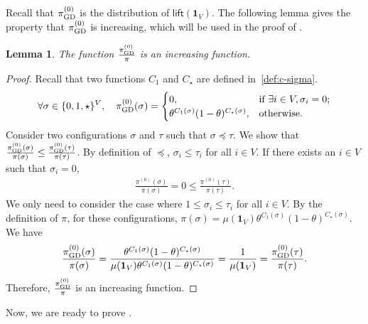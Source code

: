 \documentclass[11pt,a4paper]{article}
\newtheorem{lemma}[theorem]{Lemma}
\theoremstyle{definition}
\def\*#1{\mathbf{#1}} %
\begin{document}
Recall that $\pi^{(0)}_{\textnormal{GD}}$ is the distribution of $\textsf{lift}(\*1_V)$. The following lemma gives the property that $\pi^{(0)}_{\textnormal{GD}}$ is increasing, which will be used in the proof of .

\begin{lemma}\label{lem:pi-0-gd}
The function $\frac{\pi^{(0)}_{\textnormal{GD}}}{\pi}$ is an increasing function.
\end{lemma}
\begin{proof}
    Recall that two functions $C_1$ and $C_\star$ are defined in~\eqref{def:c-sigma}. 
    \begin{align*}
     \forall \sigma\in \{0,1,\star\}^V,\quad   \pi^{(0)}_{\textnormal{GD}}(\sigma) = \begin{cases}
            0, & \text{if } \exists i\in V, \sigma_i=0;\\
            \theta^{C_1(\sigma)}(1-\theta)^{C_\star(\sigma)}, & \text{otherwise}.
        \end{cases}  
    \end{align*}
    Consider two configurations $\sigma$ and $\tau$ such that $\sigma\preceq \tau$. We show that $\frac{\pi^{(0)}_{\textnormal{GD}}(\sigma)}{\pi(\sigma)}\leq \frac{\pi^{(0)}_{\textnormal{GD}}(\tau)}{\pi(\tau)}$. By definition of $\preceq$, $\sigma_i\leq\tau_i$ for all $i\in V$. If there exists an $i\in V$ such that $\sigma_i=0$,
    \begin{align*}
    \frac{\pi^{(0)}(\sigma)}{\pi(\sigma)}=0\leq \frac{\pi^{(0)}(\tau)}{\pi(\tau)}.
    \end{align*}
    We only need to consider the case where $1\leq \sigma_i\leq \tau_i$ for all $i\in V$.
    By the definition of $\pi$, for these configurations, $\pi(\sigma)=\mu(\*1_V)\theta^{C_1(\sigma)}(1-\theta)^{C_\star(\sigma)}$. We have
    \begin{align*}
    \frac{\pi^{(0)}_{\textnormal{GD}}(\sigma)}{\pi(\sigma)}=\frac{\theta^{C_1(\sigma)}(1-\theta)^{C_\star(\sigma)}}{\mu(\*1_V)\theta^{C_1(\sigma)}(1-\theta)^{C_\star(\sigma)}}=\frac{1}{\mu(\*1_V)}=\frac{\pi^{(0)}_{\textnormal{GD}}(\tau)}{\pi(\tau)}.
    \end{align*}
    Therefore, $\frac{\pi^{(0)}_{\textnormal{GD}}}{\pi}$ is an increasing function. 
\end{proof}



Now, we are ready to prove .
\end{document}
